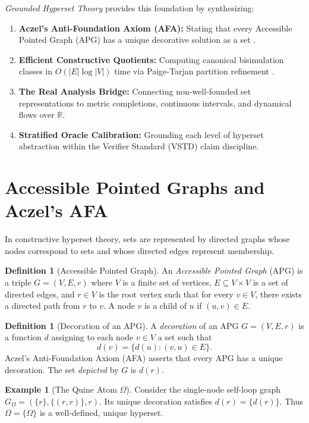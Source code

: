 \documentclass[11pt]{article}
\theoremstyle{definition}
\newtheorem{definition}[theorem]{Definition}
\newtheorem{example}[theorem]{Example}
\newcommand{\R}{\mathbb R}
\begin{document}
\emph{Grounded Hyperset Theory} provides this foundation by synthesizing:
\begin{enumerate}
\item \textbf{Aczel's Anti-Foundation Axiom (AFA):} Stating that every Accessible Pointed Graph (APG) has a unique decorative solution as a set \cite{aczel}.
\item \textbf{Efficient Constructive Quotients:} Computing canonical bisimulation classes in $O(|E| \log |V|)$ time via Paige-Tarjan partition refinement \cite{paige_tarjan}.
\item \textbf{The Real Analysis Bridge:} Connecting non-well-founded set representations to metric completions, continuous intervals, and dynamical flows over $\R$.
\item \textbf{Stratified Oracle Calibration:} Grounding each level of hyperset abstraction within the Verifier Standard (VSTD) claim discipline.
\end{enumerate}

\section{Accessible Pointed Graphs and Aczel's AFA}
In constructive hyperset theory, sets are represented by directed graphs whose nodes correspond to sets and whose directed edges represent membership.

\begin{definition}[Accessible Pointed Graph]
An \emph{Accessible Pointed Graph} (APG) is a triple $G = (V, E, r)$ where $V$ is a finite set of vertices, $E \subseteq V \times V$ is a set of directed edges, and $r \in V$ is the root vertex such that for every $v \in V$, there exists a directed path from $r$ to $v$. A node $v$ is a child of $u$ if $(u, v) \in E$.
\end{definition}

\begin{definition}[Decoration of an APG]
A \emph{decoration} of an APG $G = (V, E, r)$ is a function $d$ assigning to each node $v \in V$ a set such that
\[
d(v) = \{d(u) : (v, u) \in E\}.
\]
Aczel's Anti-Foundation Axiom (AFA) asserts that every APG has a unique decoration. The set \emph{depicted} by $G$ is $d(r)$.
\end{definition}

\begin{example}[The Quine Atom $\Omega$]
Consider the single-node self-loop graph $G_\Omega = (\{r\}, \{(r, r)\}, r)$. Its unique decoration satisfies $d(r) = \{d(r)\}$. Thus $\Omega = \{\Omega\}$ is a well-defined, unique hyperset.
\end{example}
\end{document}
